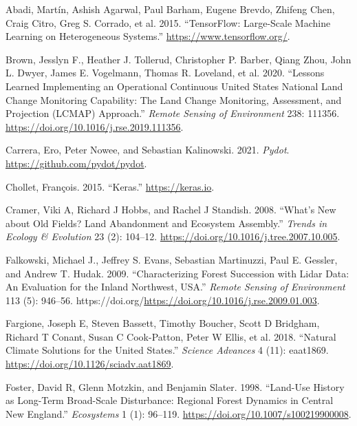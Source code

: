 \documentclass[
  letterpaper,
  DIV=11,
  numbers=noendperiod]{scrartcl}
\newlength{\cslhangindent}
\newlength{\cslentryspacingunit} %
\newenvironment{CSLReferences}[2] %
 {%
  \setlength{\parindent}{0pt}
  \ifodd #1
  \let\oldpar\par
  \def\par{\hangindent=\cslhangindent\oldpar}
  \fi
  \setlength{\parskip}{#2\cslentryspacingunit}
 }%
 {}
\begin{document}
\hypertarget{refs}{}
\begin{CSLReferences}{1}{0}
\leavevmode{}%
Abadi, Martín, Ashish Agarwal, Paul Barham, Eugene Brevdo, Zhifeng Chen,
Craig Citro, Greg S. Corrado, et al. 2015. {``{TensorFlow}: Large-Scale
Machine Learning on Heterogeneous Systems.''}
\url{https://www.tensorflow.org/}.

\leavevmode{}%
Brown, Jesslyn F., Heather J. Tollerud, Christopher P. Barber, Qiang
Zhou, John L. Dwyer, James E. Vogelmann, Thomas R. Loveland, et al.
2020. {``Lessons Learned Implementing an Operational Continuous United
States National Land Change Monitoring Capability: The Land Change
Monitoring, Assessment, and Projection (LCMAP) Approach.''} \emph{Remote
Sensing of Environment} 238: 111356.
\url{https://doi.org/10.1016/j.rse.2019.111356}.

\leavevmode{}%
Carrera, Ero, Peter Nowee, and Sebastian Kalinowski. 2021. \emph{Pydot}.
\url{https://github.com/pydot/pydot}.

\leavevmode{}%
Chollet, François. 2015. {``Keras.''} \url{https://keras.io}.

\leavevmode{}%
Cramer, Viki A, Richard J Hobbs, and Rachel J Standish. 2008. {``What's
New about Old Fields? Land Abandonment and Ecosystem Assembly.''}
\emph{Trends in Ecology \& Evolution} 23 (2): 104--12.
\url{https://doi.org/10.1016/j.tree.2007.10.005}.

\leavevmode{}%
Falkowski, Michael J., Jeffrey S. Evans, Sebastian Martinuzzi, Paul E.
Gessler, and Andrew T. Hudak. 2009. {``Characterizing Forest Succession
with Lidar Data: An Evaluation for the Inland Northwest, USA.''}
\emph{Remote Sensing of Environment} 113 (5): 946--56.
https://doi.org/\url{https://doi.org/10.1016/j.rse.2009.01.003}.

\leavevmode{}%
Fargione, Joseph E, Steven Bassett, Timothy Boucher, Scott D Bridgham,
Richard T Conant, Susan C Cook-Patton, Peter W Ellis, et al. 2018.
{``Natural Climate Solutions for the United States.''} \emph{Science
Advances} 4 (11): eaat1869.
\url{https://doi.org/10.1126/sciadv.aat1869}.

\leavevmode{}%
Foster, David R, Glenn Motzkin, and Benjamin Slater. 1998. {``Land-Use
History as Long-Term Broad-Scale Disturbance: Regional Forest Dynamics
in Central New England.''} \emph{Ecosystems} 1 (1): 96--119.
\url{https://doi.org/10.1007/s100219900008}.


\end{CSLReferences}
\end{document}
